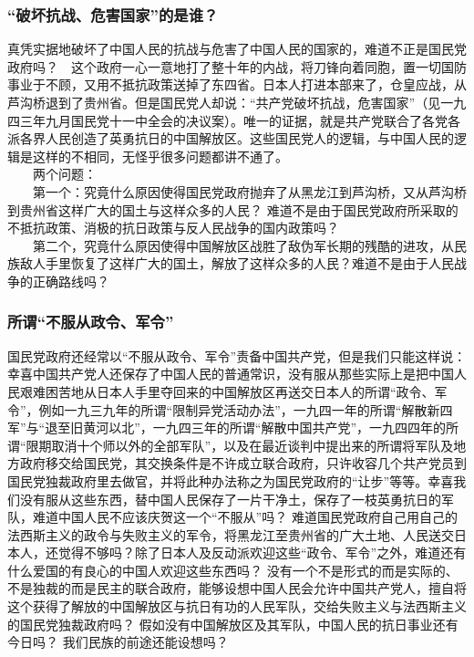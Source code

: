 \documentclass[cn,11pt,chinese]{elegantbook}
\def\myformat#1{\hfil\hfil #1}
\begin{document}
\subsubsection*{\myformat{“破坏抗战、危害国家”的是谁？}}
真凭实据地破坏了中国人民的抗战与危害了中国人民的国家的，难道不正是国民党政府吗？　这个政府一心一意地打了整十年的内战，将刀锋向着同胞，置一切国防事业于不顾，又用不抵抗政策送掉了东四省。日本人打进本部来了，仓皇应战，从芦沟桥退到了贵州省。但是国民党人却说：“共产党破坏抗战，危害国家”（见一九四三年九月国民党十一中全会的决议案）。唯一的证据，就是共产党联合了各党各派各界人民创造了英勇抗日的中国解放区。这些国民党人的逻辑，与中国人民的逻辑是这样的不相同，无怪乎很多问题都讲不通了。\\
　　两个问题：\\
　　第一个：究竟什么原因使得国民党政府抛弃了从黑龙江到芦沟桥，又从芦沟桥到贵州省这样广大的国土与这样众多的人民？ 难道不是由于国民党政府所采取的不抵抗政策、消极的抗日政策与反人民战争的国内政策吗？\\
　　第二个，究竟什么原因使得中国解放区战胜了敌伪军长期的残酷的进攻，从民族敌人手里恢复了这样广大的国土，解放了这样众多的人民？难道不是由于人民战争的正确路线吗？\\
\subsubsection*{\myformat{所谓“不服从政令、军令”}}
国民党政府还经常以“不服从政令、军令”责备中国共产党，但是我们只能这样说：幸喜中国共产党人还保存了中国人民的普通常识，没有服从那些实际上是把中国人民艰难困苦地从日本人手里夺回来的中国解放区再送交日本人的所谓“政令、军令”，例如一九三九年的所谓“限制异党活动办法”，一九四一年的所谓“解散新四军”与“退至旧黄河以北”，一九四三年的所谓“解散中国共产党”，一九四四年的所谓“限期取消十个师以外的全部军队”，以及在最近谈判中提出来的所谓将军队及地方政府移交给国民党，其交换条件是不许成立联合政府，只许收容几个共产党员到国民党独裁政府里去做官，并将此种办法称之为国民党政府的“让步”等等。幸喜我们没有服从这些东西，替中国人民保存了一片干净土，保存了一枝英勇抗日的军队，难道中国人民不应该庆贺这一个“不服从”吗？ 难道国民党政府自己用自己的法西斯主义的政令与失败主义的军令，将黑龙江至贵州省的广大土地、人民送交日本人，还觉得不够吗？除了日本人及反动派欢迎这些“政令、军令”之外，难道还有什么爱国的有良心的中国人欢迎这些东西吗？ 没有一个不是形式的而是实际的、不是独裁的而是民主的联合政府，能够设想中国人民会允许中国共产党人，擅自将这个获得了解放的中国解放区与抗日有功的人民军队，交给失败主义与法西斯主义的国民党独裁政府吗？ 假如没有中国解放区及其军队，中国人民的抗日事业还有今日吗？ 我们民族的前途还能设想吗？\\
\end{document}
